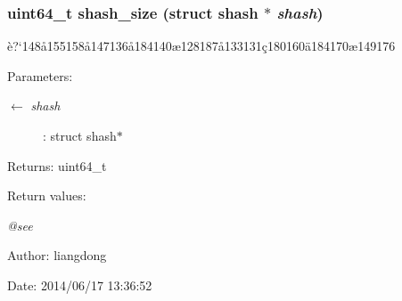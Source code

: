 \subsubsection{\setlength{\rightskip}{0pt plus 5cm}uint64\_\-t shash\_\-size (struct shash $\ast$ {\em shash})}\label{shash_8h_a10}


\`{e}?`148\aa{}155158\aa{}147136\aa{}184140\ae{}128187\aa{}133131\c{c}180160\"{a}184170\ae{}149176 

\begin{Desc}
\item[Parameters:]
\begin{description}
\item[\mbox{$\leftarrow$} {\em shash}]: struct shash$\ast$ \end{description}
\end{Desc}
\begin{Desc}
\item[Returns:]uint64\_\-t \end{Desc}
\begin{Desc}
\item[Return values:]
\begin{description}
\item[{\em @see}]\end{description}
\end{Desc}
\begin{Desc}
\item[Author:]liangdong \end{Desc}
\begin{Desc}
\item[Date:]2014/06/17 13:36:52 \end{Desc}
